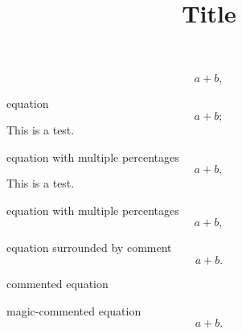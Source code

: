 \documentclass[12pt]{article}
\title{Title}
\author{}
\date{}
\begin{document}

%
\begin{equation}
  a+b
  ,
\end{equation}
%

equation
%
\begin{equation}
  a+b
  ;
\end{equation}
%
This is a test.

equation with multiple percentages
%
\begin{equation}
  a+b
  ,
\end{equation}
%
This is a test.

equation with multiple percentages
%
\begin{equation}
  a+b
  ,
\end{equation}
%

equation surrounded by comment
%
\begin{equation}
  a+b
  .
\end{equation}
%

commented equation

magic-commented equation
%
\begin{equation}
  a+b.
\end{equation}
%
\end{document}
